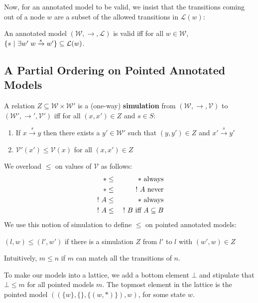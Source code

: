 Now, for an annotated model to be valid, we insist that the transitions coming out of a node $w$ are a subset of the allowed transitions in $\mathcal{L}(w)$:
\begin{definition}
An annotated model $(\mathcal{W}, \rightarrow, \mathcal{L})$ is valid iff for all $w \in \mathcal{W}$, $ \{s \ | \  \exists w' \; w \xrightarrow{s} w'\} \subseteq \mathcal{L}(w)$.
\end{definition}

\subsection{A Partial Ordering on Pointed Annotated Models}
A relation $Z \subseteq \mathcal{W} \times \mathcal{W}'$ is a (one-way) {\bf simulation} from  $(\mathcal{W}, \rightarrow, \mathcal{V})$ to $(\mathcal{W}', \rightarrow', \mathcal{V}')$ iff for all $(x,x') \in Z$ and $s \in S$:
\begin{enumerate}
\item
If $x \xrightarrow{s} y$ then there exists a $y' \in \mathcal{W}'$ such that $(y,y') \in Z$ and $x' \xrightarrow{s} y'$
\item
$\mathcal{V}'(x') \leq \mathcal{V}(x)$ for all $(x,x') \in Z$
\end{enumerate}
We overload $\leq$ on values of $\mathcal{V}$ as follows:
\begin{eqnarray}
\ast & \leq & \ast \mbox{ always} \nonumber \\
\ast & \leq & \ ! \  A \mbox{ never}  \nonumber \\
\ ! \  A & \leq & \ast \mbox{ always}  \nonumber \\
\ ! \  A & \leq & \ ! \  B \mbox{ iff } A \subseteq B \nonumber
\end{eqnarray}
We use this notion of simulation to define $\leq$ on pointed annotated models:
\begin{definition}
$(l,w) \leq (l',w')$ if there is a simulation $Z$ from $l'$ to $l$ with $(w',w) \in Z$
\end{definition}
Intuitively, $m \leq n$ if $m$ can match all the transitions of $n$.

To make our models into a lattice, we add a bottom element $\bot$ and stipulate that $\bot \leq m$ for all pointed models $m$.
The topmost element in the lattice is the pointed model $( (\{w\}, \{\}, \{(w, \ast)\}), w)$, for some state $w$.

